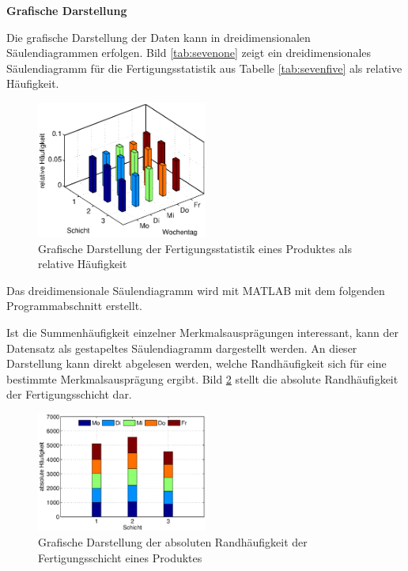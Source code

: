 {\selectfont
\noindent\textbf{Grafische Darstellung}}\smallskip

\noindent Die grafische Darstellung der Daten kann in dreidimensionalen S\"{a}ulendiagrammen erfolgen. Bild \ref{tab:sevenone} zeigt ein dreidimensionales S\"{a}ulendiagramm f\"{u}r die Fertigungsstatistik aus Tabelle \ref{tab:sevenfive} als relative H\"{a}ufigkeit.

\noindent 
\begin{figure}[H]
  \centerline{\includegraphics[width=0.5\textwidth]{Kapitel7/Bilder/image1}}
  \caption{Grafische Darstellung der Fertigungsstatistik eines Produktes als relative H\"{a}ufigkeit}
  \label{fig:Fertigungsstatistik1}
\end{figure}

\noindent Das dreidimensionale S\"{a}ulendiagramm wird mit MATLAB mit dem folgenden Programmabschnitt erstellt.



\noindent Ist die Summenh\"{a}ufigkeit einzelner Merkmalsauspr\"{a}gungen interessant, kann der Datensatz als gestapeltes S\"{a}ulendiagramm dargestellt werden. An dieser Darstellung kann direkt abgelesen werden, welche Randh\"{a}ufigkeit sich f\"{u}r eine bestimmte Merkmalsauspr\"{a}gung ergibt. Bild \ref{fig:Fertigungsstatistik2} stellt die absolute Randh\"{a}ufigkeit der Fertigungsschicht dar.

\noindent 
\begin{figure}[H]
  \centerline{\includegraphics[width=0.5\textwidth]{Kapitel7/Bilder/image2}}
  \caption{Grafische Darstellung der absoluten Randh\"{a}ufigkeit der Fertigungsschicht eines Produktes}
  \label{fig:Fertigungsstatistik2}
\end{figure}

